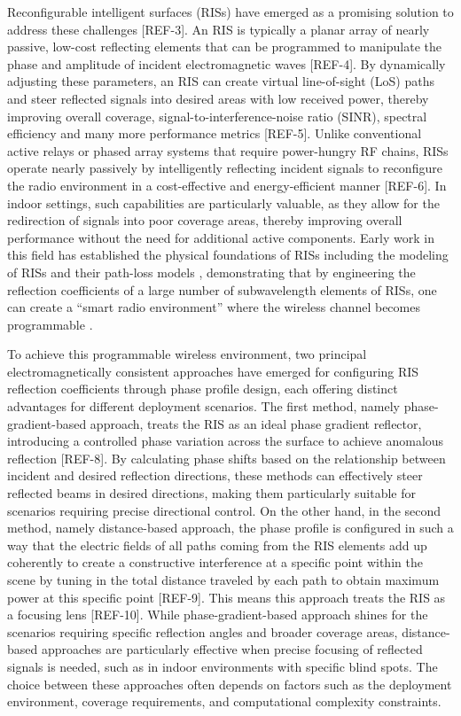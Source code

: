 \documentclass{IEEEoj}
\begin{document}
Reconfigurable intelligent surfaces (RISs) have emerged as a promising solution to address these challenges [REF-3]. An RIS is typically a planar array of nearly passive, low-cost reflecting elements that can be programmed to manipulate the phase and amplitude of incident electromagnetic waves [REF-4]. By dynamically adjusting these parameters, an RIS can create virtual line-of-sight (LoS) paths and steer reflected signals into desired areas with low received power, thereby improving overall coverage, signal-to-interference-noise ratio (SINR), spectral efficiency and many more performance metrics [REF-5]. Unlike conventional active relays or phased array systems that require power-hungry RF chains, RISs operate nearly passively by intelligently reflecting incident signals to reconfigure the radio environment in a cost-effective and energy-efficient manner [REF-6]. In indoor settings, such capabilities are particularly valuable, as they allow for the redirection of signals into poor coverage areas, thereby improving overall performance without the need for additional active components. Early work in this field has established the physical foundations of RISs including the modeling of RISs and their path-loss models \cite{path-loss1,path-loss2,Tang}, demonstrating that by engineering the reflection coefficients of a large number of subwavelength elements of RISs, one can create a “smart radio environment” where the wireless channel becomes programmable \cite{pan2021reconfigurable}.

To achieve this programmable wireless environment, two principal electromagnetically consistent approaches have emerged for configuring RIS reflection coefficients through phase profile design, each offering distinct advantages for different deployment scenarios. The first method, namely phase-gradient-based approach, treats the RIS as an ideal phase gradient reflector, introducing a controlled phase variation across the surface to achieve anomalous reflection [REF-8]. By calculating phase shifts based on the relationship between incident and desired reflection directions, these methods can effectively steer reflected beams in desired directions, making them particularly suitable for scenarios requiring precise directional control. On the other hand, in the second method, namely distance-based approach, the phase profile is configured in such a way that the electric fields of all paths coming from the RIS elements add up coherently to create a constructive interference at a specific point within the scene by tuning in the total distance traveled by each path to obtain maximum power at this specific point [REF-9]. This means this approach treats the RIS as a focusing lens [REF-10]. While phase-gradient-based approach shines for the scenarios requiring specific reflection angles and broader coverage areas, distance-based approaches are particularly effective when precise focusing of reflected signals is needed, such as in indoor environments with specific blind spots. The choice between these approaches often depends on factors such as the deployment environment, coverage requirements, and computational complexity constraints.
\end{document}
